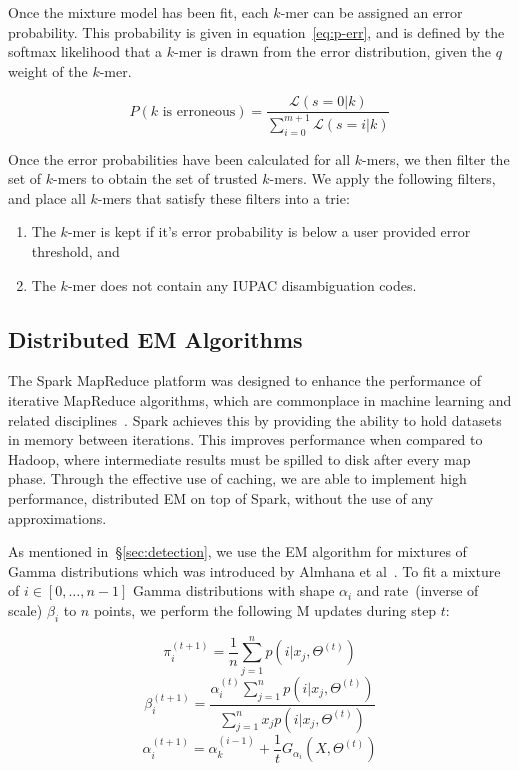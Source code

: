 \documentclass{llncs}
\begin{document}
Once the mixture model has been fit, each $k$-mer can be assigned an error probability. This
probability is given in equation~\eqref{eq:p-err}, and is defined by the softmax likelihood that a $k$-mer
is drawn from the error distribution, given the $q$ weight of the $k$-mer.

\begin{equation}
\label{eq:p-err}
P(k \text{ is erroneous}) = \frac{\mathcal{L}(s = 0 | k)}{\sum_{i = 0}^{m + 1} \mathcal{L}(s = i | k)}
\end{equation}

Once the error probabilities have been calculated for all $k$-mers, we then filter the set of $k$-mers
to obtain the set of trusted $k$-mers. We apply the following filters, and place all $k$-mers that satisfy
these filters into a trie:

\begin{enumerate}
\item The $k$-mer is kept if it's error probability is below a user provided error threshold, and
\item The $k$-mer does not contain any IUPAC disambiguation codes.
\end{enumerate}

\subsection{Distributed EM Algorithms}
\label{sec:distributed-em}

The Spark MapReduce platform was designed to enhance the performance of iterative MapReduce
algorithms, which are commonplace in machine learning and related disciplines~\cite{zaharia10}. Spark
achieves this by providing the ability to hold datasets in memory between iterations. This improves
performance when compared to Hadoop, where intermediate results must be spilled to disk after every
map phase. Through the effective use of caching, we are able to implement high performance,
distributed EM on top of Spark, without the use of any approximations.

As mentioned in~\S\ref{sec:detection}, we use the EM algorithm for mixtures of Gamma distributions
which was introduced by Almhana et al~\cite{almhana06}. To fit a mixture of $i \in [0, \dots, n - 1]$
Gamma distributions with shape $\alpha_i$ and rate~(inverse of scale) $\beta_i$ to $n$ points, we
perform the following M updates during step $t$:

\begin{equation}
\label{eq:gamma-em-pi}
\pi_i^{(t + 1)} = \frac{1}{n} \sum_{j = 1}^n p(i | x_j, \Theta^{(t)})
\end{equation}
\begin{equation}
\label{eq:gamma-em-beta}
\beta_i^{(t + 1)} = \frac{\alpha_i^{(t)} \sum_{j = 1}^n p(i | x_j, \Theta^{(t)})}{\sum_{j = 1}^n x_j p(i | x_j,
\Theta^{(t)})}
\end{equation}
\begin{equation}
\label{eq:gamma-em-alpha}
\alpha_i^{(t + 1)} = \alpha_k^{(i - 1)} + \frac{1}{t} G_{\alpha_i}(X, \Theta^{(t)})
\end{equation}
\end{document}
